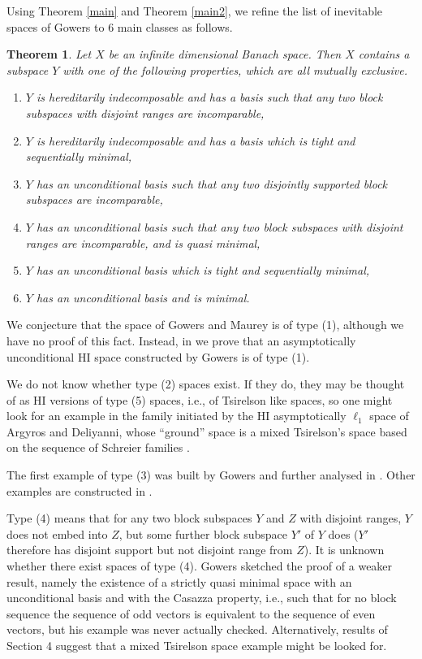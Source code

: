 \documentclass[10pt]{amsart}
\numberwithin{equation}{section}
\newtheorem{thm}{Theorem}[section]
\begin{document}
Using Theorem \ref{main} and Theorem \ref{main2}, we refine the list of
inevitable spaces of Gowers to 6 main classes as follows.

\begin{thm} \label{gowersbis}
Let $X$ be an infinite dimensional Banach space. Then $X$ contains a subspace
$Y$ with one of the following properties, which are all mutually exclusive.
\begin{enumerate}
\item  $Y$ is hereditarily indecomposable and has a basis such that any two block subspaces with disjoint ranges are incomparable,
\item $Y$ is hereditarily indecomposable and has a basis which is tight and sequentially minimal,
\item $Y$ has an unconditional basis such that any two disjointly supported block subspaces are incomparable,
\item $Y$ has an unconditional basis such that any two block subspaces with disjoint ranges are incomparable, and is quasi minimal,
\item $Y$ has an unconditional basis which is tight and sequentially minimal,
\item $Y$ has an unconditional basis and is minimal.
\end{enumerate}\end{thm}

We conjecture that the space of Gowers and Maurey is of type (1), although we
have no  proof of this fact. Instead, in \cite{exemples} we prove that an
asymptotically unconditional  HI space constructed by Gowers
\cite{g:asymptotic} is of type (1).

We do not know whether type (2) spaces exist. If they do, they may be thought
of as HI versions of type (5) spaces, i.e., of Tsirelson like spaces, so one
might look for an example in the family initiated by the HI asymptotically
$\ell_1$ space of Argyros and Deliyanni, whose ``ground'' space is a mixed
Tsirelson's space based on the sequence of Schreier families \cite{AD}.

The first example of type (3) was built by Gowers \cite{g:hyperplanes} and
further analysed in \cite{GM2}. Other examples are constructed in
\cite{exemples}.

Type (4) means that for any two block subspaces $Y$ and $Z$ with disjoint
ranges, $Y$ does not embed into $Z$, but some further block subspace $Y'$ of
$Y$ does ($Y'$ therefore has disjoint support but not disjoint range from $Z$).
It is unknown whether there exist spaces of type (4). Gowers sketched  the
proof of a weaker result, namely the existence of a strictly quasi minimal
space with an unconditional basis and with the Casazza property, i.e., such
that for no block sequence the sequence of odd vectors is equivalent to the
sequence of even vectors, but his example was never actually checked.
Alternatively, results of \cite{KLMT} Section 4 suggest that a mixed Tsirelson
space example might be looked for.
\end{document}
